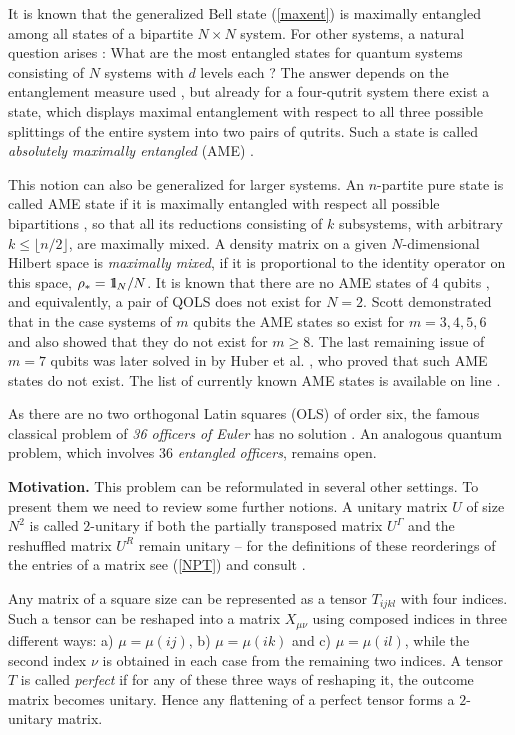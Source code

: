 \documentclass[english,aps,pra,nofootinbib,twocolumn,superscriptaddress]{revtex4-1}
\newcommand{\1}{{\rm 1\hspace{-0.9mm}l}}
\begin{document}
It is known that the generalized Bell state (\ref{maxent})
is maximally entangled among all states of a 
bipartite $N \times N$ system.
For other systems, a natural question arises
 \cite{GBP98,HS00,KNM02, Sc04,BSSB05,BP+07,FFPP08,MGP10,FFMPP10b,AC13}:
What are the most entangled states for quantum systems consisting of $N$ systems
with $d$ levels each ? 
The answer depends on the entanglement measure used \cite{BZ17},
but already for a four-qutrit system there exist a state, 
which displays maximal entanglement with respect 
to all three possible splittings of the entire system into two pairs of qutrits.
Such a state is
called {\sl absolutely maximally entangled} (AME) \cite{HCLRL12}.

This notion can also be generalized for larger systems.
An $n$-partite pure state is  called AME state  
if it is maximally entangled with respect all possible bipartitions \cite{HCLRL12},
so that all its reductions consisting of  $k$  subsystems, 
with arbitrary  $k \leq   \lfloor {n}/{2} \rfloor$,  are maximally mixed. 
A density matrix  on 
a given $N$-dimensional Hilbert space is {\it maximally mixed},
if it is proportional to the identity operator 
on this space, $\rho_{*}={\1}_N/{N}$.
It is known that there are no AME states of 4 qubits \cite{HS00},
and equivalently,  a pair of  QOLS does not exist for $N=2$.
Scott demonstrated  \cite{Sc04} that in the case 
systems of $m$ qubits the AME states so exist for $m=3,4,5,6$
and also showed that they do not exist for $m\ge 8$.
The last remaining issue of  $m=7$ qubits was later solved in 
by Huber et al. \cite{HGS17},
who proved that such AME states do not exist.
The list of currently known AME states is available on line \cite{HW_table}.

As there are no two orthogonal Latin squares (OLS)
of order six, the famous classical problem of {\sl 36 officers of Euler}
 has no solution \cite{CGSS05}. An analogous quantum problem,
which involves $36$ {\sl entangled officers},  remains open. 
\medskip

{\bf Motivation.}
This problem can be reformulated in several  other settings.
To present them we need to review some further notions.
A unitary matrix $U$ of size $N^2$ is called $2$-unitary \cite {GALR15}
if both the partially transposed matrix $U^{\Gamma}$
and the reshuffled matrix $U^R$  remain unitary -- for the definitions 
of these reorderings of the entries of a matrix
see (\ref{NPT}) and consult \cite{BZ17}.

Any matrix of a square size can be represented as a tensor 
$T_{ijkl}$ with four indices.
   Such a tensor can be reshaped into a matrix $X_{\mu\nu}$
  using composed indices in three different ways:
   a) $\mu=\mu(ij)$, 
   b) $\mu=\mu(ik)$  and c) $\mu=\mu(il)$,
     while the second index  $\nu$ is obtained in each case  from the
      remaining two indices.
     A tensor $T$ is called {\sl perfect} \cite{PYHP15} 
    if for any of these three ways of reshaping it, the outcome matrix becomes unitary. 
    Hence any  flattening of a perfect tensor forms a $2$-unitary matrix.
\smallskip
\end{document}
